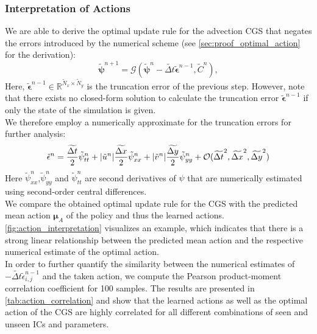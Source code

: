 \documentclass{article}
\theoremstyle{plain}
\theoremstyle{definition}
\theoremstyle{remark}
\begin{document}
\subsubsection{Interpretation of Actions}
\label{sec:int}
We are able to derive the optimal update rule for the advection CGS that negates the errors introduced by the numerical scheme (see \cref{sec:proof_optimal_action} for the derivation):
\begin{equation}
\tilde{\boldsymbol\psi}^{n+1} = \mathcal G (\tilde{\boldsymbol\psi}^{n} - \widetilde{\Delta t} \tilde{\boldsymbol\epsilon}^{n-1}, \tilde C^n),
\end{equation}
Here, $ \tilde{\boldsymbol\epsilon}^{n-1} \in \mathbb R^{\tilde N_x \times \tilde N_y}$ is the truncation error of the previous step. However, note that there exists no closed-form solution to calculate the truncation error $\tilde{\boldsymbol\epsilon}^{n-1}$ if only the state of the simulation is given.\\
We therefore employ a numerically approximate for the truncation errors for further analysis:
\begin{equation}
\small{\tilde \epsilon^{n} = \frac{\widetilde{\Delta t}}{2} \tilde \psi_{tt}^n + |\tilde u^n| \frac{\widetilde{\Delta x}}{2}\tilde \psi_{xx}^n + |\tilde v^n| \frac{\widetilde{\Delta y}}{2}\tilde \psi_{yy}^n + \mathcal O(\widetilde{\Delta t}^2, \widetilde{\Delta x}^2, \widetilde{\Delta y}^2)}
\end{equation}
Here $\tilde \psi_{xx}^n$,$\tilde \psi_{yy}^n$ and $\tilde \psi_{tt}^n$ are second derivatives of $\psi$ that are numerically estimated using second-order central differences.\\
We compare the obtained optimal update rule for the CGS with the predicted mean action $\boldsymbol \mu_A$ of the policy and thus the learned actions. \cref{fig:action_interpretation} visualizes an example, which indicates that there is a strong linear relationship between the predicted mean action and the respective numerical estimate of the optimal action. \\
In order to further quantify the similarity between the numerical estimates of $- \widetilde{\Delta t} \tilde{\epsilon}^{n-1}_{i,j}$ and the taken action, we compute the Pearson product-moment correlation coefficient for 100 samples. The results are presented in \cref{tab:action_correlation} and show that the learned actions as well as the optimal action of the CGS are highly correlated for all different combinations of seen and unseen ICs and parameters. 
\end{document}
